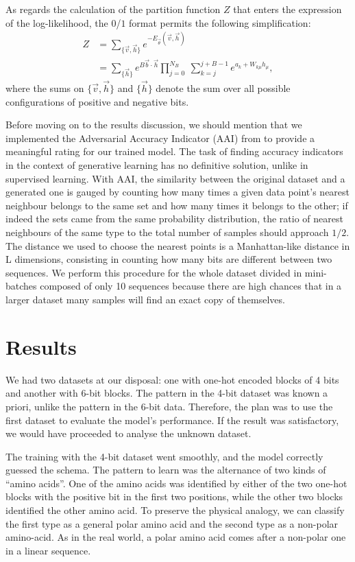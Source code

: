 \documentclass[prl, twocolumn]{revtex4-2}
\begin{document}
As regards the calculation of the partition function $Z$ that enters the expression
of the log-likelihood, the $0$/$1$ format permits the following simplification:
\begin{equation}
\begin{split}
    Z&=\sum_{\{\vec{v}, \vec{h}\}} e^{-E_{\vec{\theta}}(\vec{v}, \vec{h})}\\
    &=\sum_{\{\vec{h}\}} e^{B\vec{b}\cdot\vec{h}} \prod_{j=0}^{N_B} ~ \sum_{k=j}^{j+B-1} e^{a_k+W_{k\mu}h_\mu},
    \end{split}
\end{equation}
where the sums on $\{\vec{v}, \vec{h}\}$ and $\{\vec{h}\}$ denote the sum over all possible
configurations of positive and negative bits.

Before moving on to the results discussion, we should mention that we
implemented the Adversarial Accuracy Indicator (AAI) from \cite{Yale2020} to
provide a meaningful rating for our trained model. The task of finding accuracy 
indicators in the context of generative learning has no definitive solution, 
unlike in supervised learning. With AAI, the similarity between the original 
dataset and a generated one is gauged by counting how many times a given data 
point’s nearest neighbour belongs to the same set and how many times it belongs 
to the other; if indeed the sets came from the same probability distribution, 
the ratio of nearest neighbours of the same type to the total number of samples should approach $1 / 2$. 
The distance we used to choose the nearest points is a Manhattan-like distance in L dimensions, consisting in counting how many bits are different between two sequences. 
We perform this procedure for the whole dataset divided in mini-batches composed of only 10 sequences because there are high chances that in a larger dataset many samples will find an exact copy of themselves.


\section{Results}
We had two datasets at our disposal: one with one-hot encoded blocks of 4 bits and another with 6-bit blocks. The pattern in the 4-bit dataset was known a priori, unlike the pattern in the 6-bit data. Therefore, the plan was to use the first dataset to evaluate the model’s performance. If the result was satisfactory, we would have proceeded to analyse the unknown dataset.

The training with the 4-bit dataset went smoothly, and the model correctly guessed the schema.
The pattern to learn was the alternance of two kinds of “amino acids”. One of the amino acids was
identified by either of the two one-hot blocks with the positive bit in the first two positions, 
while the other two blocks identified the other amino acid. To preserve the physical analogy, we 
can classify the first type as a general polar amino acid and the second type as a non-polar
amino-acid. As in the real world, a polar amino acid comes after a non-polar one in a linear sequence.
\end{document}
